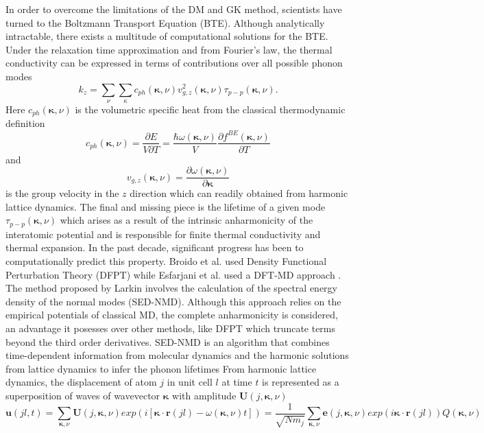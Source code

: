\documentclass[aps,prb,preprint,preprintnumbers,amsmath,amssymb,floatfix,superscriptaddress]{revtex4}
\begin{document}
In order to overcome the limitations of the DM and GK method, scientists have turned to the Boltzmann Transport Equation (BTE). Although analytically intractable, there exists a multitude of computational solutions for the BTE. Under the relaxation time approximation and from Fourier's law, the thermal conductivity can be expressed in terms of contributions over all possible phonon modes \cite{sellan_CP}
%
\begin{equation}
	k_{z}= \sum_\nu\sum_\kappa c_{ph}(\pmb{\kappa},\nu)v^2_{g,z}(\pmb{\kappa}, \nu)\tau_{p-p}(\pmb{\kappa}, \nu).
\end{equation}
%
Here $c_{ph}(\pmb{\kappa},\nu)$ is the volumetric specific heat from the classical thermodynamic definition
%
\begin{equation}
c_{ph}(\pmb{\kappa},\nu)=\frac{\partial E}{V\partial T}=\frac{\hbar\omega(\pmb{\kappa},\nu)}{V}\frac{\partial f^{BE}(\pmb{\kappa}, \nu)}{\partial T}	
\end{equation}
%
and
\begin{equation}
v_{g,z}(\pmb{\kappa}, \nu)=\frac{\partial \omega(\pmb{\kappa},\nu)}{\partial \pmb{\kappa}}
\end{equation}
is the group velocity in the $z$ direction which can readily obtained from harmonic lattice dynamics. The final and missing piece is the lifetime of a given mode $\tau_{p-p}(\pmb{\kappa}, \nu)$ which arises as a result of the intrinsic anharmonicity of the interatomic potential and is responsible for finite thermal conductivity and thermal expansion. In the past decade, significant progress has been to computationally predict this property. Broido et al. used Density Functional Perturbation Theory (DFPT) \cite{Broido1} while Esfarjani et al. used a DFT-MD approach \cite{PhysRevB.84.085204}. The method proposed by Larkin \cite{larkin} involves the calculation of the spectral energy density of the normal modes (SED-NMD). Although this approach relies on the empirical potentials of classical MD, the complete anharmonicity is considered, an advantage it posesses over other methods, like DFPT which truncate terms beyond the third order derivatives. SED-NMD is an algorithm that combines time-dependent information from molecular dynamics and the harmonic solutions from lattice dynamics to infer the phonon lifetimes From harmonic lattice dynamics, the displacement of atom $j$ in unit cell $l$ at time $t$ is represented as a superposition of waves of wavevector $\pmb{\kappa}$ with amplitude $\pmb{U}(j,\pmb{\kappa},\nu)$
\begin{equation}
\pmb{u}(jl,t)=\sum_{\pmb{\kappa},\nu}\pmb{U}(j,\pmb{\kappa},\nu)exp(i[\pmb{\kappa}\cdot\pmb{r}(jl)-\omega(\pmb{\kappa},\nu)t])=\frac{1}{\sqrt{Nm_j}}\sum_{\pmb{\kappa},\nu}\pmb{e}(j,\pmb{\kappa},\nu)exp(i\pmb{\kappa}\cdot\pmb{r}(jl))Q(\pmb{\kappa},\nu)
\end{equation}
\end{document}
